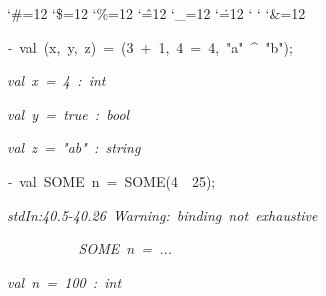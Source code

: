 \begin{list}{}
{\setlength{\leftmargin}{\leftmargini}
\setlength{\rightmargin}{0cm}
\setlength{\itemindent}{0cm}
\setlength{\listparindent}{0cm}
\setlength{\itemsep}{0cm}
\setlength{\parsep}{0cm}
\setlength{\labelsep}{0cm}
\setlength{\labelwidth}{0cm}
\catcode`\#=12
\catcode`\$=12
\catcode`\%=12
\catcode`\^=12
\catcode`\_=12
\catcode`\.=12
\catcode`
\catcode`
\catcode`\&=12
\ttfamily}
\small
\item[]\textsl{-\ }val\ (x,\ y,\ z)\ =\ (3\ +\ 1,\ 4\ =\ 4,\ "a"\ ^\ "b");
\item[]\textsl{val\ x\ =\ 4\ :\ int}
\item[]\textsl{val\ y\ =\ true\ :\ bool}
\item[]\textsl{val\ z\ =\ "ab"\ :\ string}
\item[]\textsl{-\ }val\ SOME\ n\ =\ SOME(4\ \ 25);
\item[]\textsl{stdIn:40.5-40.26\ Warning:\ binding\ not\ exhaustive}
\item[]\textsl{\ \ \ \ \ \ \ \ \ \ SOME\ n\ =\ ...}
\item[]\textsl{val\ n\ =\ 100\ :\ int}
\end{list}
